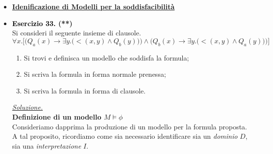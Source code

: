 \documentclass[a4paper,10pt]{article}
\begin{document}
    {\normalsize
    \begin{itemize}[label=, leftmargin=0pt]
    

    
    

    \item \textbf{\underline{Idenificazione di Modelli per la soddisfacibilità}}
    
    \item \textbf{\textcolor{black}{Esercizio 33.} (**)} \\ 	
    Si consideri il seguente insieme di clausole.
    $$\forall x.\bigg[\bigg(Q_a(x) \rightarrow \exists y.\bigg(<(x,y)\land Q_b(y)\bigg)\bigg) \land \bigg( Q_b(x)\rightarrow \exists y.\bigg( <(x,y)\land Q_a(y) \bigg) \bigg)\bigg]$$
    
    \begin{enumerate}
    \item Si trovi e definisca un modello che soddisfa la formula;
    \item Si scriva la formula in forma normale prenessa;
    \item Si scriva la formula in forma di clausole.\\[0.1cm]
    \end{enumerate}

    \begin{osservazioni}
    \underline{\textit{Soluzione.}}\\

    \textbf{Definizione di un modello $M\models\phi$}\\
    Consideriamo dapprima la produzione di un modello per la formula proposta. A tal proposito, ricordiamo come sia necessario identificare sia un \textit{dominio} $D$, sia una \textit{interpretazione} $I$. \\


\end{osservazioni}
\end{itemize}}
\end{document}
